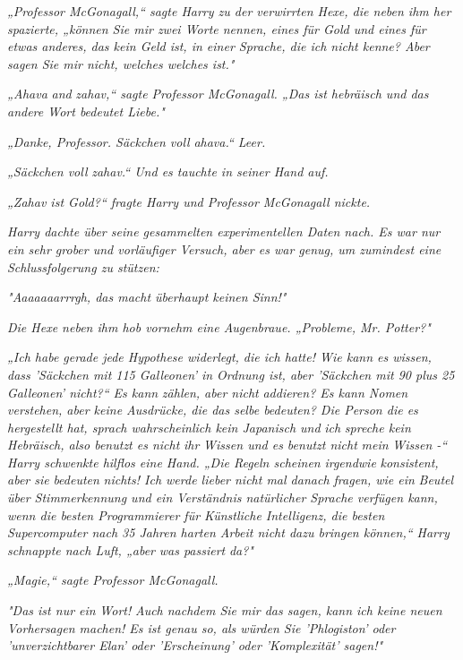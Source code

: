 {\emph{„Professor McGonagall,“ sagte Harry zu der verwirrten Hexe, die neben ihm her spazierte, „können Sie mir zwei Worte nennen, eines für Gold und eines für etwas anderes, das kein Geld ist, in einer Sprache, die ich nicht kenne? Aber sagen Sie mir nicht, welches welches ist."}

\emph{„\emph{Ahava}} \emph{and} \emph{\emph{zahav,}“ sagte Professor McGonagall. „Das ist hebräisch und das andere Wort bedeutet Liebe."}

\emph{„Danke, Professor. Säckchen voll} \emph{\emph{ahava.}“ Leer.}

\emph{„Säckchen voll} \emph{\emph{zahav.}“ Und es tauchte in seiner Hand auf.}

\emph{„Zahav ist Gold?“ fragte Harry und Professor McGonagall nickte.}

\emph{Harry dachte über seine gesammelten experimentellen Daten nach. Es war nur ein sehr grober und vorläufiger Versuch, aber es war genug, um zumindest eine Schlussfolgerung zu stützen:}

\emph{"\emph{Aaaaaaarrrgh, das macht überhaupt keinen Sinn!}"}

\emph{Die Hexe neben ihm hob vornehm eine Augenbraue. „Probleme, Mr. Potter?"}

\emph{„Ich habe gerade jede Hypothese widerlegt, die ich hatte! Wie kann es wissen, dass 'Säckchen mit 115 Galleonen' in Ordnung ist, aber 'Säckchen mit 90 plus 25 Galleonen' nicht?“ Es kann} \emph{\emph{zählen}, aber nicht} \emph{\emph{addieren}? Es kann Nomen verstehen, aber keine Ausdrücke, die das selbe bedeuten? Die Person die es hergestellt hat, sprach wahrscheinlich kein Japanisch und} \emph{\emph{ich}} \emph{spreche kein Hebräisch, also benutzt es nicht} \emph{\emph{ihr}} \emph{Wissen und es benutzt nicht} \emph{\emph{mein}} \emph{Wissen -“ Harry schwenkte hilflos eine Hand. „Die Regeln scheinen} \emph{\emph{irgendwie}} \emph{konsistent, aber sie} \emph{\emph{bedeuten}} \emph{nichts! Ich werde lieber nicht mal danach fragen, wie ein} \emph{\emph{Beutel}} \emph{über Stimmerkennung und ein Verständnis natürlicher Sprache verfügen kann, wenn die besten Programmierer für Künstliche Intelligenz, die besten Supercomputer nach 35 Jahren harten Arbeit nicht dazu bringen können,“ Harry schnappte nach Luft, „aber} \emph{\emph{was passiert}} \emph{da?"}

\emph{„Magie,“ sagte Professor McGonagall.}

\emph{"Das ist nur ein} \emph{\emph{Wort!}} \emph{Auch nachdem Sie mir das sagen, kann ich keine neuen Vorhersagen machen! Es ist genau so, als würden Sie 'Phlogiston' oder 'unverzichtbarer Elan' oder 'Erscheinung' oder 'Komplexität' sagen!"}

}
